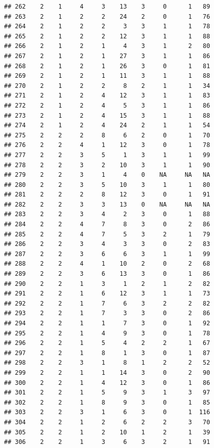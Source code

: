 \documentclass[krantz2,ChapterTOCs]{krantz}\usepackage{knitr}
\begin{document}
\begin{knitrout}
\begin{kframe}
\begin{verbatim}
## 262    2    1     4     3    13    3     0      1   89
## 263    2    1     2     2    24    2     0      1   76
## 264    2    1     2     2     3    3     1      1   78
## 265    2    1     2     2    12    3     1      1   88
## 266    2    1     2     1     4    3     1      2   80
## 267    2    1     2     1    27    3     1      1   86
## 268    2    1     2     1    26    3     0      1   81
## 269    2    1     2     1    11    3     1      1   88
## 270    2    1     2     2     8    2     1      1   34
## 271    2    1     2     4    12    3     1      1   83
## 272    2    1     2     4     5    3     1      1   86
## 273    2    1     2     4    15    3     1      1   88
## 274    2    1     2     4    24    2     1      1   54
## 275    2    2     2     8     6    2     0      1   70
## 276    2    2     4     1    12    3     0      1   78
## 277    2    2     3     5     1    3     1      1   99
## 278    2    2     3     2    10    3     1      1   90
## 279    2    2     3     1     4    0    NA     NA   NA
## 280    2    2     3     5    10    3     1      1   80
## 281    2    2     2     8    12    3     0      1   91
## 282    2    2     3     3    13    0    NA     NA   NA
## 283    2    2     3     4     2    3     0      1   88
## 284    2    2     4     7     8    3     0      2   86
## 285    2    2     4     7     5    3     2      1   79
## 286    2    2     3     4     3    3     0      2   83
## 287    2    2     3     6     6    3     1      1   99
## 288    2    2     4     1    10    2     0      2   68
## 289    2    2     3     6    13    3     0      1   86
## 290    2    2     1     3     1    2     1      2   82
## 291    2    2     1     6    12    3     1      1   73
## 292    2    2     1     7     6    3     2      2   82
## 293    2    2     1     7     3    3     0      2   86
## 294    2    2     1     1     7    3     0      1   92
## 295    2    2     1     4     9    3     0      1   78
## 296    2    2     1     5     4    2     2      1   67
## 297    2    2     1     8     1    3     0      1   87
## 298    2    2     3     1     8    1     2      2   52
## 299    2    2     1     1    14    3     0      2   90
## 300    2    2     1     4    12    3     0      1   86
## 301    2    2     1     5     9    3     1      3   97
## 302    2    2     1     8     9    3     0      1   85
## 303    2    2     3     1     6    3     0      1  116
## 304    2    2     1     2     6    2     2      3   70
## 305    2    2     1     2    10    1     2      1   39
## 306    2    2     1     3     6    3     2      1   91

\end{verbatim}
\end{kframe}
\end{knitrout}
\end{document}
